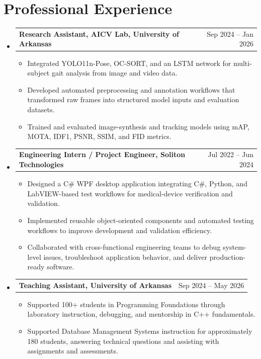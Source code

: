 \documentclass[letterpaper,10pt]{article}
\makeatletter
\newcommand{\resumeSingleHeading}[2]{\vspace{1pt}\item\begin{tabular*}{0.985\textwidth}{l@{\extracolsep{\fill}}r}\textbf{#1} & \small#2 \\ \end{tabular*}\vspace{2pt}}
\newcommand{\resumeItem}[1]{\item\small{#1}}
\newcommand{\resumeSubHeadingListStart}{\begin{itemize}[leftmargin=0.0in,label={}]}
\newcommand{\resumeSubHeadingListEnd}{\end{itemize}\vspace{-2pt}}
\newcommand{\resumeItemListStart}{\begin{itemize}[leftmargin=0.17in]}
\newcommand{\resumeItemListEnd}{\end{itemize}\vspace{2pt}}
\makeatother
\begin{document}
\section{Professional Experience}
\resumeSubHeadingListStart
  \resumeSingleHeading{Research Assistant, AICV Lab, University of Arkansas}{Sep 2024 -- Jan 2026}
  \resumeItemListStart
    \resumeItem{Integrated YOLO11n-Pose, OC-SORT, and an LSTM network for multi-subject gait analysis from image and video data.}
    \resumeItem{Developed automated preprocessing and annotation workflows that transformed raw frames into structured model inputs and evaluation datasets.}
    \resumeItem{Trained and evaluated image-synthesis and tracking models using mAP, MOTA, IDF1, PSNR, SSIM, and FID metrics.}
  \resumeItemListEnd
  \resumeSingleHeading{Engineering Intern / Project Engineer, Soliton Technologies}{Jul 2022 -- Jun 2024}
  \resumeItemListStart
    \resumeItem{Designed a C\# WPF desktop application integrating C\#, Python, and LabVIEW-based test workflows for medical-device verification and validation.}
    \resumeItem{Implemented reusable object-oriented components and automated testing workflows to improve development and validation efficiency.}
    \resumeItem{Collaborated with cross-functional engineering teams to debug system-level issues, troubleshoot application behavior, and deliver production-ready software.}
  \resumeItemListEnd
  \resumeSingleHeading{Teaching Assistant, University of Arkansas}{Sep 2024 -- May 2026}
  \resumeItemListStart
    \resumeItem{Supported 100+ students in Programming Foundations through laboratory instruction, debugging, and mentorship in C++ fundamentals.}
    \resumeItem{Supported Database Management Systems instruction for approximately 180 students, answering technical questions and assisting with assignments and assessments.}
  \resumeItemListEnd
\resumeSubHeadingListEnd
\end{document}
